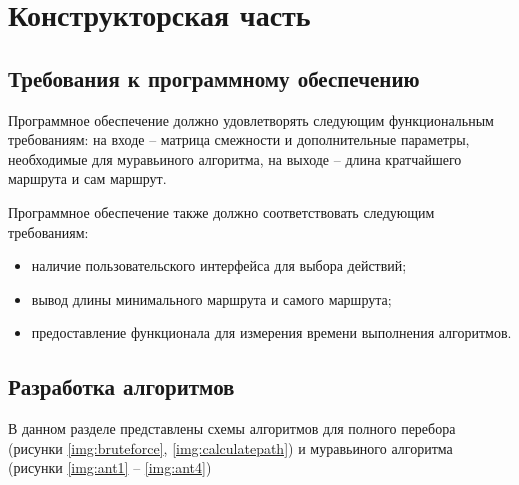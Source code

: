 \chapter{Конструкторская часть}

\section{Требования к программному обеспечению}\label{section:requirements}

Программное обеспечение должно удовлетворять следующим функциональным требованиям: на входе -- матрица смежности и дополнительные параметры, необходимые для муравьиного алгоритма, на выходе -- длина кратчайшего маршрута и сам маршрут.

Программное обеспечение также должно соответствовать следующим требованиям:
\begin{itemize}[label=---]
	\item наличие пользовательского интерфейса для выбора действий;
	\item вывод длины минимального маршрута и самого маршрута;
	\item предоставление функционала для измерения времени выполнения алгоритмов.
\end{itemize}

\section{Разработка алгоритмов}
В данном разделе представлены схемы алгоритмов для полного перебора (рисунки \ref{img:bruteforce}, \ref{img:calculatepath}) и муравьиного алгоритма (рисунки \ref{img:ant1} -- \ref{img:ant4})

